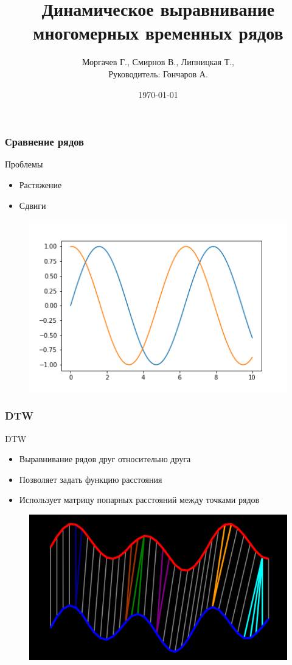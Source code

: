 \documentclass{beamer}
\title[DTW]{Динамическое выравнивание многомерных временных рядов}
\author{Моргачев Г., Смирнов В., Липницкая Т., \\ Руководитель: Гончаров А.}
\date{\today}
\begin{document}

\begin{frame}
\titlepage 
\end{frame}


\begin{frame}
\frametitle{Сравнение рядов}
	\begin{block}{Проблемы}
        \begin{itemize}
            \item Растяжение
            \item Сдвиги
        \end{itemize}
    \end{block}
    \begin{figure}
        \includegraphics[width=0.6\linewidth]{2}
    \end{figure}
\end{frame}


\begin{frame}
\frametitle{DTW}
    \begin{block}{DTW}
        \begin{itemize}
            \item Выравнивание рядов друг относительно друга
            \item Позволяет задать функцию расстояния
            \item Использует матрицу попарных расстояний между точками рядов
        \end{itemize} 
    \end{block}
    \begin{figure}
        \includegraphics[width=0.6\linewidth]{1}
    \end{figure}
\end{frame}
    
\end{document}
